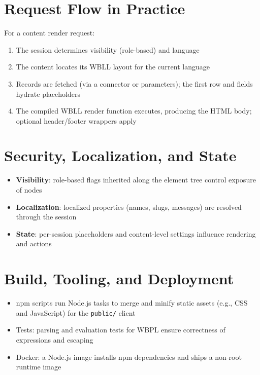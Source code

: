 \section{Request Flow in Practice}
For a content render request:
\begin{enumerate}
	\item The session determines visibility (role-based) and language
	\item The content locates its WBLL layout for the current language
	\item Records are fetched (via a connector or parameters); the first row and fields hydrate placeholders
	\item The compiled WBLL render function executes, producing the HTML body; optional header/footer wrappers apply
\end{enumerate}

\section{Security, Localization, and State}
\begin{itemize}
	\item \textbf{Visibility}: role-based flags inherited along the element tree control exposure of nodes
	\item \textbf{Localization}: localized properties (names, slugs, messages) are resolved through the session
	\item \textbf{State}: per-session placeholders and content-level settings influence rendering and actions
\end{itemize}

\section{Build, Tooling, and Deployment}
\begin{itemize}
	\item npm scripts run Node.js tasks to merge and minify static assets (e.g., CSS and JavaScript) for the \texttt{public/} client
	\item Tests: parsing and evaluation tests for WBPL ensure correctness of expressions and escaping
	\item Docker: a Node.js image installs npm dependencies and ships a non-root runtime image
\end{itemize}

